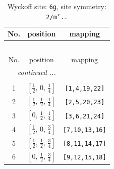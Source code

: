 \documentclass[fleqn,8pt]{jsarticle}
\begin{document}
\renewcommand{\arraystretch}{1.2}
\begin{longtable}{ccc}
\caption{Wyckoff site: {\tt 6g}, site symmetry: {\tt 2/m'..}}
 \\
 \hline \hline
No. & position & mapping \\ \hline \endfirsthead

\multicolumn{2}{l}{\tablename\ \thetable{}} \\
 \hline \hline
No. & position & mapping \\ \hline \endhead

 \hline \hline
\multicolumn{2}{r}{\footnotesize\it continued ...} \\ \endfoot

 \hline \hline
\multicolumn{2}{r}{} \\ \endlastfoot

1 & $\left[ \frac{1}{2},\, 0,\, \frac{1}{4} \right]$ & {\tt [1,4,19,22]} \\ \hline
2 & $\left[ \frac{1}{2},\, \frac{1}{2},\, \frac{1}{4} \right]$ & {\tt [2,5,20,23]} \\ \hline
3 & $\left[ 0,\, \frac{1}{2},\, \frac{1}{4} \right]$ & {\tt [3,6,21,24]} \\ \hline
4 & $\left[ \frac{1}{2},\, 0,\, \frac{3}{4} \right]$ & {\tt [7,10,13,16]} \\ \hline
5 & $\left[ \frac{1}{2},\, \frac{1}{2},\, \frac{3}{4} \right]$ & {\tt [8,11,14,17]} \\ \hline
6 & $\left[ 0,\, \frac{1}{2},\, \frac{3}{4} \right]$ & {\tt [9,12,15,18]} \\
\end{longtable}
\renewcommand{\arraystretch}{1.2}
\end{document}
